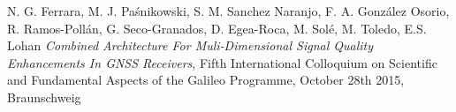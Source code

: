 \documentclass[english,a4paper]{europasscv}
\begin{document}
\begin{europasscv}
{N. G. Ferrara, M. J. Paśnikowski, S. M. Sanchez Naranjo, F. A. González Osorio, R. Ramos-Pollán, G. Seco-Granados, D. Egea-Roca, M. Solé, M. Toledo, E.S. Lohan \textit{Combined Architecture For Muli-Dimensional Signal Quality Enhancements In GNSS Receivers}, Fifth International Colloquium on Scientific and Fundamental Aspects of the Galileo Programme, October 28th 2015, Braunschweig
}
  
  \end{europasscv}
\end{document}
